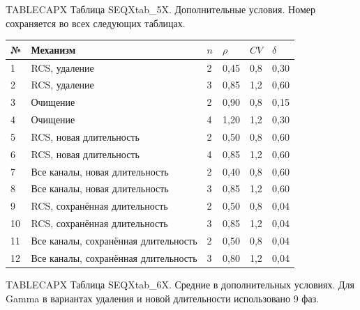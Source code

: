 \noindent TABLECAPX Таблица SEQXtab_5X. Дополнительные условия. Номер сохраняется во всех следующих таблицах.\par

\setlength{\tabcolsep}{2pt}
\begin{tabular}{p{0.76cm}p{7.65cm}p{1.04cm}p{1.89cm}p{1.89cm}p{1.89cm}}
\toprule
№ & Механизм & $n$ & $\rho$ & $CV$ & $\delta$ \\
\midrule
1 & RCS, удаление & 2 & 0,45 & 0,8 & 0,30 \\
2 & RCS, удаление & 3 & 0,85 & 1,2 & 0,60 \\
3 & Очищение & 2 & 0,90 & 0,8 & 0,15 \\
4 & Очищение & 4 & 1,20 & 1,2 & 0,30 \\
5 & RCS, новая длительность & 2 & 0,50 & 0,8 & 0,60 \\
6 & RCS, новая длительность & 4 & 0,85 & 1,2 & 0,60 \\
7 & Все каналы, новая длительность & 2 & 0,40 & 0,8 & 0,60 \\
8 & Все каналы, новая длительность & 3 & 0,85 & 1,2 & 0,60 \\
9 & RCS, сохранённая длительность & 2 & 0,50 & 0,8 & 0,04 \\
10 & RCS, сохранённая длительность & 3 & 0,85 & 1,2 & 0,04 \\
11 & Все каналы, сохранённая длительность & 2 & 0,50 & 0,8 & 0,04 \\
12 & Все каналы, сохранённая длительность & 3 & 0,80 & 1,2 & 0,04 \\
\bottomrule
\end{tabular}




\noindent TABLECAPX Таблица SEQXtab_6X. Средние в дополнительных условиях. Для Gamma в вариантах удаления и новой длительности использовано 9 фаз.\par

